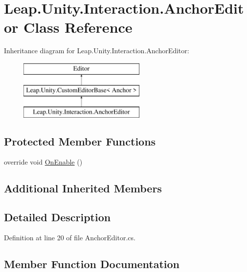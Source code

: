 \hypertarget{class_leap_1_1_unity_1_1_interaction_1_1_anchor_editor}{}\section{Leap.\+Unity.\+Interaction.\+Anchor\+Editor Class Reference}
\label{class_leap_1_1_unity_1_1_interaction_1_1_anchor_editor}
Inheritance diagram for Leap.\+Unity.\+Interaction.\+Anchor\+Editor\+:\begin{figure}[H]
\begin{center}
\leavevmode
\includegraphics[height=3.000000cm]{class_leap_1_1_unity_1_1_interaction_1_1_anchor_editor}
\end{center}
\end{figure}
\subsection*{Protected Member Functions}
\begin{DoxyCompactItemize}
\item 
override void \mbox{\hyperlink{class_leap_1_1_unity_1_1_interaction_1_1_anchor_editor_a5a092b5cb6adad1efb94c213942340ca}{On\+Enable}} ()
\end{DoxyCompactItemize}
\subsection*{Additional Inherited Members}


\subsection{Detailed Description}


Definition at line 20 of file Anchor\+Editor.\+cs.



\subsection{Member Function Documentation}
\mbox{\label{class_leap_1_1_unity_1_1_interaction_1_1_anchor_editor_a5a092b5cb6adad1efb94c213942340ca}} 

